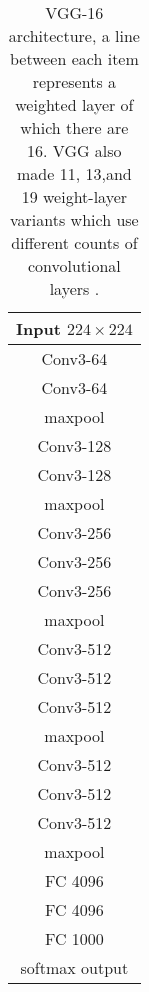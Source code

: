 \begin{table}
    \begin{center}
        \begin{tabular}{| c |}
        \hline
        Input $224 \times 224$ \\
        \hline
        Conv3-64 \\
        Conv3-64 \\
        \hline
        maxpool\\
        \hline
        Conv3-128 \\
        Conv3-128 \\
        \hline
        maxpool \\
        \hline
        Conv3-256 \\
        Conv3-256 \\
        Conv3-256 \\
        \hline
        maxpool \\
        \hline
        Conv3-512 \\
        Conv3-512 \\
        Conv3-512 \\
        \hline
        maxpool \\
        \hline
        Conv3-512 \\
        Conv3-512 \\
        Conv3-512 \\
        \hline
        maxpool\\
        \hline
        FC 4096\\
        \hline
        FC 4096\\
        \hline
        FC 1000\\
        \hline
        softmax output\\
        \hline
        \end{tabular}
        \caption{VGG-16 architecture, a line between each item represents a weighted layer of which there are 16. VGG also made 11, 13,and 19 weight-layer variants which use different counts of convolutional layers \cite{vgg16-arxiv}.}
    \end{center}
\end{table}


